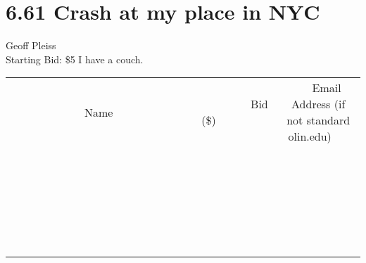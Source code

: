 \documentclass[11pt]{article}
\begin{document}
\section*{6.61 Crash at my place in NYC}
Geoff Pleiss
\\
Starting Bid: \$5
\newline
I have a couch.
\\[6ex]
\begin{tabular}{c c c}
~~~~~~~~~~~~~Name~~~~~~~~~~~~~ & ~~~~~~~~~Bid (\$)~~~~~~~~~  & ~~~Email Address (if not standard olin.edu)~~~\\
 & & \\
\hline
 & & \\
\hline
 & & \\
\hline
 & & \\
\hline
 & & \\
\hline
 & & \\
\hline
 & & \\
\hline
 & & \\
\hline
 & & \\
\hline
 & & \\
\hline
 & & \\
\hline
 & & \\
\hline
 & & \\
\hline
 & & \\
\hline
 & & \\
\hline
 & & \\
\hline
 & & \\
\hline
 & & \\
\hline
 & & \\
\hline
 & & \\
\hline
 & & \\
\hline
 & & \\
\hline
 & & \\
\hline
 & & \\
\hline
 & & \\
\hline
 & & \\
\hline
\end{tabular}
\newpage
\end{document}
